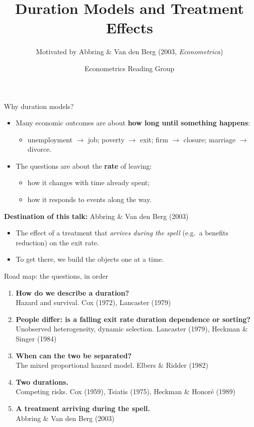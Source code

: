 \documentclass[aspectratio=169,10pt]{beamer}
\title{Duration Models and Treatment Effects}
\subtitle{Motivated by Abbring \& Van den Berg (2003, \textit{Econometrica})}
\author{Econometrics Reading Group}
\date{}
\begin{document}
\begin{frame}
  \titlepage
\end{frame}

\begin{frame}{Why duration models?}
  \begin{itemize}
    \item Many economic outcomes are about \textbf{how long until something happens}:
      \begin{itemize}
        \item unemployment $\rightarrow$ job; poverty $\rightarrow$ exit; firm $\rightarrow$ closure; marriage $\rightarrow$ divorce.
      \end{itemize}
    \item The questions are about the \textbf{rate} of leaving:
      \begin{itemize}
        \item how it changes with time already spent;
        \item how it responds to events along the way.
      \end{itemize}
  \end{itemize}
  \bigskip
  \textbf{Destination of this talk:} Abbring \& Van den Berg (2003)
  \begin{itemize}
    \item The effect of a treatment that \emph{arrives during the spell} (e.g.\ a benefits reduction) on the exit rate.
    \item To get there, we build the objects one at a time.
  \end{itemize}
\end{frame}

\begin{frame}{Road map: the questions, in order}
  \begin{enumerate}
    \item \textbf{How do we describe a duration?}\\ Hazard and survival. \hfill {\small Cox (1972), Lancaster (1979)}
    \medskip
    \item \textbf{People differ: is a falling exit rate duration dependence or sorting?}\\ Unobserved heterogeneity, dynamic selection. \hfill {\small Lancaster (1979), Heckman \& Singer (1984)}
    \medskip
    \item \textbf{When can the two be separated?}\\ The mixed proportional hazard model. \hfill {\small Elbers \& Ridder (1982)}
    \medskip
    \item \textbf{Two durations.}\\ Competing risks. \hfill {\small Cox (1959), Tsiatis (1975), Heckman \& Honor\'e (1989)}
    \medskip
    \item \textbf{A treatment arriving during the spell.}\\ \hfill {\small Abbring \& Van den Berg (2003)}
  \end{enumerate}
\end{frame}
\end{document}
